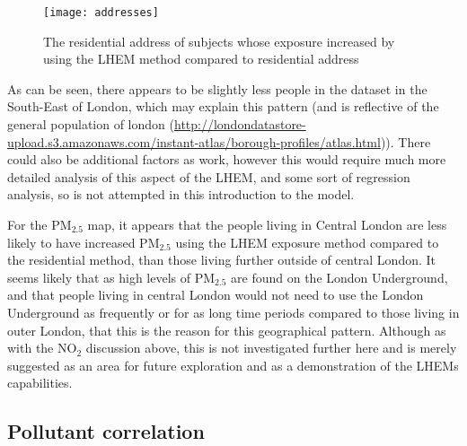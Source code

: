 \begin{figure}[H]
\centering
\texttt{[image: addresses]}
\caption{The residential address of subjects whose exposure increased by using the LHEM method compared to residential address}
\label{fig:addresses}
\end{figure}

As can be seen, there appears to be slightly less people in the dataset in the South-East of London, which may explain this pattern (and is reflective of the general population of london (\url{http://londondatastore-upload.s3.amazonaws.com/instant-atlas/borough-profiles/atlas.html})). There could also be additional factors as work, however this would require much more detailed analysis of this aspect of the LHEM, and some sort of regression analysis, so is not attempted in this introduction to the model.

For the PM$_{2.5}$ map, it appears that the people living in Central London are less likely to have increased PM$_{2.5}$ using the LHEM exposure method compared to the residential method, than those living further outside of central London. It seems likely that as high levels of PM$_{2.5}$ are found on the London Underground, and that people living in central London would not need to use the London Underground as frequently or for as long time periods compared to those living in outer London, that this is the reason for this geographical pattern. Although as with the NO$_{2}$ discussion above, this is not investigated further here and is merely suggested as an area for future exploration and as a demonstration of the LHEMs capabilities.

\subsection{Pollutant correlation}
\label{subsec:pollutant_correlation}

